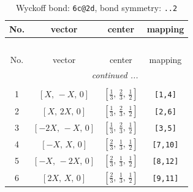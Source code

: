 \documentclass[fleqn,8pt]{jsarticle}
\begin{document}
\renewcommand{\arraystretch}{1.2}
\begin{longtable}{cccc}
\caption{Wyckoff bond: {\tt 6c@2d}, bond symmetry: {\tt ..2}}
 \\
 \hline \hline
No. & vector & center & mapping \\ \hline \endfirsthead

\multicolumn{3}{l}{\tablename\ \thetable{}} \\
 \hline \hline
No. & vector & center & mapping \\ \hline \endhead

 \hline \hline
\multicolumn{3}{r}{\footnotesize\it continued ...} \\ \endfoot

 \hline \hline
\multicolumn{3}{r}{} \\ \endlastfoot

1 & $\left[ X,\, - X,\, 0 \right]$ & $\left[ \frac{1}{3},\, \frac{2}{3},\, \frac{1}{2} \right]$ & {\tt [1,4]} \\ \hline
2 & $\left[ X,\, 2 X,\, 0 \right]$ & $\left[ \frac{1}{3},\, \frac{2}{3},\, \frac{1}{2} \right]$ & {\tt [2,6]} \\ \hline
3 & $\left[ - 2 X,\, - X,\, 0 \right]$ & $\left[ \frac{1}{3},\, \frac{2}{3},\, \frac{1}{2} \right]$ & {\tt [3,5]} \\ \hline
4 & $\left[ - X,\, X,\, 0 \right]$ & $\left[ \frac{2}{3},\, \frac{1}{3},\, \frac{1}{2} \right]$ & {\tt [7,10]} \\ \hline
5 & $\left[ - X,\, - 2 X,\, 0 \right]$ & $\left[ \frac{2}{3},\, \frac{1}{3},\, \frac{1}{2} \right]$ & {\tt [8,12]} \\ \hline
6 & $\left[ 2 X,\, X,\, 0 \right]$ & $\left[ \frac{2}{3},\, \frac{1}{3},\, \frac{1}{2} \right]$ & {\tt [9,11]} \\
\end{longtable}
\renewcommand{\arraystretch}{1.2}
\end{document}
